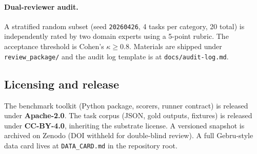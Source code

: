 \paragraph{Dual-reviewer audit.} A stratified random subset (seed
\texttt{20260426}, 4 tasks per category, 20 total) is independently rated by
two domain experts using a 5-point rubric. The acceptance threshold is Cohen's
$\kappa \geq 0.8$. Materials are shipped under \texttt{review\_package/} and
the audit log template is at \texttt{docs/audit-log.md}.

\subsection{Licensing and release}

The benchmark toolkit (Python package, scorers, runner contract) is released
under \textbf{Apache-2.0}. The task corpus (JSON, gold outputs, fixtures) is
released under \textbf{CC-BY-4.0}, inheriting the substrate license. A
versioned snapshot is archived on Zenodo
(DOI withheld for double-blind review).
A full Gebru-style data card lives at \texttt{DATA\_CARD.md} in the repository
root.
